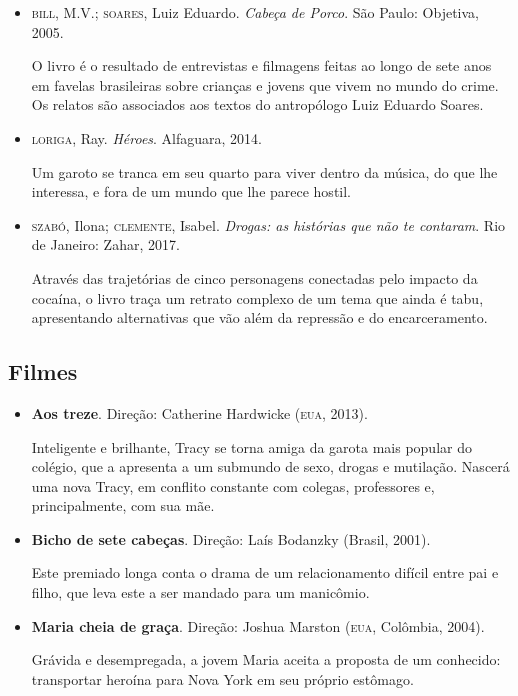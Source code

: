 \documentclass{article}
\begin{document}
\begin{itemize}
\item\textsc{bill}, M.V.; \textsc{soares}, Luiz Eduardo. \textit{Cabeça de Porco}. São Paulo: Objetiva, 2005.

O livro é o resultado de entrevistas e filmagens feitas ao longo de sete
anos em favelas brasileiras sobre crianças e jovens que vivem no mundo
do crime. Os relatos são associados aos textos do antropólogo Luiz
Eduardo Soares.

\item\textsc{loriga}, Ray. \textit{Héroes}. Alfaguara, 2014.

Um garoto se tranca em seu quarto para viver dentro da música, do que
lhe interessa, e fora de um mundo que lhe parece hostil.

\item\textsc{szabó}, Ilona; \textsc{clemente}, Isabel. \textit{Drogas: as histórias que não te contaram}. Rio de Janeiro: Zahar, 2017.

Através das trajetórias de cinco personagens conectadas pelo impacto da
cocaína, o livro traça um retrato complexo de um tema que ainda é tabu,
apresentando alternativas que vão além da repressão e do encarceramento.
\end{itemize}

\subsection{Filmes}

\begin{itemize}
\item\textbf{Aos treze}. Direção: Catherine Hardwicke (\textsc{eua}, 2013).

Inteligente e brilhante, Tracy se torna amiga da garota mais popular do
colégio, que a apresenta a um submundo de sexo, drogas e mutilação.
Nascerá uma nova Tracy, em conflito constante com colegas, professores
e, principalmente, com sua mãe.

\item\textbf{Bicho de sete cabeças}. Direção: Laís Bodanzky (Brasil, 2001).

Este premiado longa conta o drama de um relacionamento difícil entre pai
e filho, que leva este a ser mandado para um manicômio.

\item\textbf{Maria cheia de graça}. Direção: Joshua Marston (\textsc{eua}, Colômbia, 2004).

Grávida e desempregada, a jovem Maria aceita a proposta de um conhecido:
transportar heroína para Nova York em seu próprio estômago.
\end{itemize}
\end{document}
